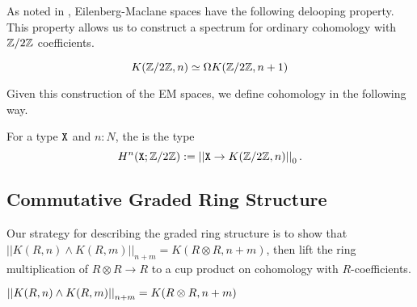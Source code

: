 \documentclass{amsart}
\begin{document}
As noted in \cite{fl:em}, Eilenberg-Maclane spaces have the following delooping property. This property allows us to construct a spectrum for ordinary cohomology with $\mathbb{Z}/2\mathbb{Z}$ coefficients. 

\begin{proposition}\label{prop:EM-loop-equiv}
	\[K(\mathbb{Z}/2\mathbb{Z},n)\simeq \Omega K(\mathbb{Z}/2\mathbb{Z},n+1)\]
	\end{proposition}

Given this construction of the EM spaces, we define cohomology in the following way. 

\begin{definition}
	For a type $\mathtt{X}$ and $n:N$, the  is the type
	\[H^n(\mathtt{X};\mathbb{Z}/2\mathbb{Z}):= \left| \left| \mathtt{X}\rightarrow K(\mathbb{Z}/2\mathbb{Z},n)\right| \right|_0.\] 
\end{definition}



\subsection{Commutative Graded Ring Structure}



 Our strategy for describing the graded ring structure is to show that $||K(R,n)\wedge K(R,m)||_{n+m} = K(R\otimes R, n+m)$, then  lift the ring multiplication of $R \otimes R \to R$ to a cup product on cohomology with $R$-coefficients.



\begin{proposition}\label{prop:K_smash}
	$ \left| \left| K(R,n) \wedge K(R,m)\right| \right|_{n+m} = K(R \otimes R, n+m)$
\end{proposition} 
\end{document}
